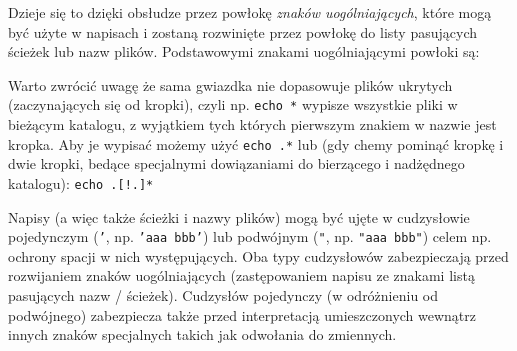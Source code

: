 Dzieje się to dzięki obsłudze przez powłokę \textit{znaków uogólniających}, które mogą być użyte w napisach i zostaną rozwinięte przez powłokę do listy pasujących ścieżek lub nazw plików.
Podstawowymi znakami uogólniającymi powłoki są:
Warto zwrócić uwagę że sama gwiazdka nie dopasowuje plików ukrytych (zaczynających się od kropki), czyli np. \Verb$echo *$ wypisze wszystkie pliki w bieżącym katalogu, z wyjątkiem tych których pierwszym znakiem w nazwie jest kropka. Aby je wypisać możemy użyć \Verb$echo .*$ lub (gdy chemy pominąć kropkę i dwie kropki, bedące specjalnymi dowiązaniami do bierzącego i nadżędnego katalogu):  \Verb$echo .[!.]*$

Napisy (a więc także ścieżki i nazwy plików) mogą być ujęte w cudzysłowie pojedynczym (\texttt{'}, np. \texttt{'aaa bbb'}) lub podwójnym (\texttt{"}, np. \texttt{"aaa bbb"}) celem np. ochrony spacji w nich występujących.
Oba typy cudzysłowów zabezpieczają przed rozwijaniem znaków uogólniających (zastępowaniem napisu ze znakami listą pasujących nazw / ścieżek).
Cudzysłów pojedynczy (w odróżnieniu od podwójnego) zabezpiecza także przed interpretacją umieszczonych wewnątrz innych znaków specjalnych takich jak odwołania do zmiennych.

